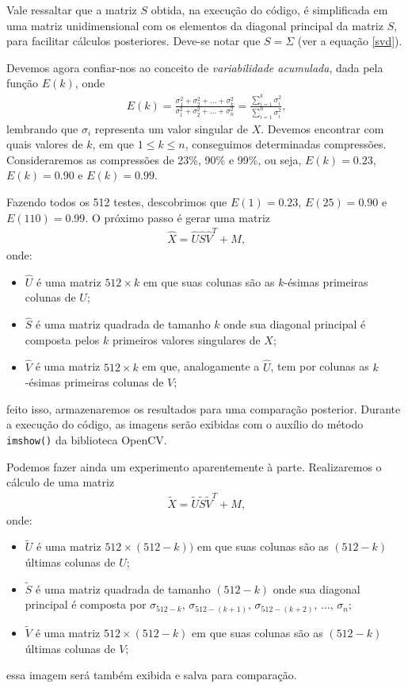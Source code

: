 \documentclass[a4paper,12pt]{article}
\begin{document}
Vale ressaltar que a matriz $S$ obtida, na execução do código, é simplificada em uma matriz unidimensional com os elementos da diagonal principal da matriz $S$, para facilitar cálculos posteriores. Deve-se notar que $S = \Sigma$ (ver a equação \eqref{svd}).

Devemos agora confiar-nos ao conceito de \emph{variabilidade acumulada}, dada pela função $E(k)$, onde 
\begin{align*}
E(k) = \frac{\sigma_{1}^2 + \sigma_{2}^2 + \dots + \sigma_{k}^2}{\sigma_{1}^2 + \sigma_{2}^2 + \dots + \sigma_{n}^2} =\frac{\sum_{i = 1}^{k} \sigma_{i}^2}{\sum_{i = 1}^{n} \sigma_{i}^2} \text{,}
\end{align*}
lembrando que $\sigma_{i}$ representa um valor singular de $X$. Devemos encontrar com quais valores de $k$, em que $1 \leq k \leq n$, conseguimos determinadas compressões. Consideraremos as compressões de 23\%, 90\% e 99\%, ou seja, $E(k) = 0.23$, $E(k) = 0.90$ e $E(k) = 0.99$.

Fazendo todos os 512 testes, descobrimos que $E(1) = 0.23$, $E(25) = 0.90$ e $E(110) = 0.99$. O próximo passo é gerar uma matriz 
\begin{align*}
\hat{X} = \hat{U} \hat{S} \hat{V}^{T} + M \text{,}
\end{align*}
onde:
\begin{itemize}
\item $\hat{U}$ é uma matriz $512 \times k$ em que suas colunas são as $k$-ésimas primeiras colunas de $U$;
\item $\hat{S}$ é uma matriz quadrada de tamanho $k$ onde sua diagonal principal é composta pelos $k$ primeiros valores singulares de $X$;
\item $\hat{V}$ é uma matriz $512 \times k$ em que, analogamente a $\hat{U}$, tem por colunas as $k$-ésimas primeiras colunas de $V$;
\end{itemize}
feito isso, armazenaremos os resultados para uma comparação posterior. Durante a execução do código, as imagens serão exibidas com o auxílio do método \texttt{imshow()} da biblioteca OpenCV.

Podemos fazer ainda um experimento aparentemente à parte. Realizaremos o cálculo de uma matriz 
\begin{align*}
\tilde{X} = \tilde{U} \tilde{S} \tilde{V}^{T} + M \text{,}
\end{align*}
onde:
\begin{itemize}
\item $\tilde{U}$ é uma matriz $512 \times (512 - k))$ em que suas colunas são as $(512 - k)$ últimas colunas de $U$;
\item $\tilde{S}$ é uma matriz quadrada de tamanho $(512 - k)$ onde sua diagonal principal é composta por $\sigma_{512 - k} \text{, } \sigma_{512 - (k + 1)} \text{, } \sigma_{512 - (k + 2)} \text{, } \dots \text{, } \sigma_{n}$;
\item $\tilde{V}$ é uma matriz $512 \times (512 - k)$ em que suas colunas são as $(512 - k)$ últimas colunas de $V$;
\end{itemize}
essa imagem será também exibida e salva para comparação.
\end{document}
